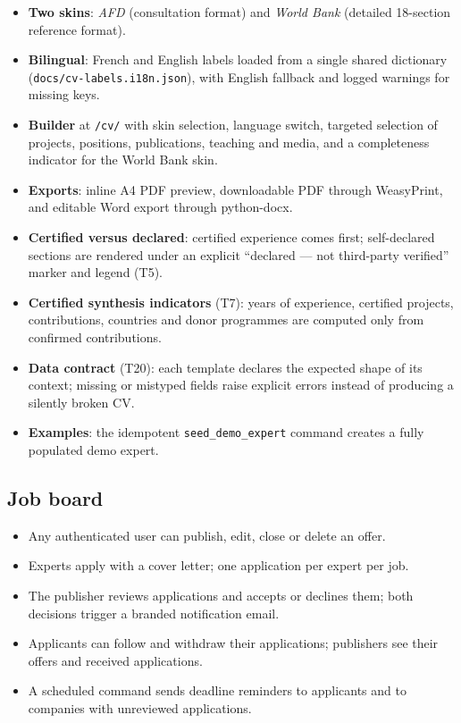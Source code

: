 \documentclass[11pt,a4paper]{article}
\begin{document}
\begin{itemize}[leftmargin=1.4em,itemsep=3pt]
  \item \textbf{Two skins}: \emph{AFD} (consultation format) and \emph{World
        Bank} (detailed 18-section reference format).
  \item \textbf{Bilingual}: French and English labels loaded from a single
        shared dictionary (\texttt{docs/cv-labels.i18n.json}), with English
        fallback and logged warnings for missing keys.
  \item \textbf{Builder} at \texttt{/cv/} with skin selection, language switch,
        targeted selection of projects, positions, publications, teaching and
        media, and a completeness indicator for the World Bank skin.
  \item \textbf{Exports}: inline A4 PDF preview, downloadable PDF through
        WeasyPrint, and editable Word export through python-docx.
  \item \textbf{Certified versus declared}: certified experience comes first;
        self-declared sections are rendered under an explicit ``declared ---
        not third-party verified'' marker and legend (T5).
  \item \textbf{Certified synthesis indicators} (T7): years of experience,
        certified projects, contributions, countries and donor programmes are
        computed only from confirmed contributions.
  \item \textbf{Data contract} (T20): each template declares the expected shape
        of its context; missing or mistyped fields raise explicit errors
        instead of producing a silently broken CV.
  \item \textbf{Examples}: the idempotent \texttt{seed\_demo\_expert} command
        creates a fully populated demo expert.
\end{itemize}

\subsection{Job board}

\begin{itemize}[leftmargin=1.4em,itemsep=3pt]
  \item Any authenticated user can publish, edit, close or delete an offer.
  \item Experts apply with a cover letter; one application per expert per job.
  \item The publisher reviews applications and accepts or declines them; both
        decisions trigger a branded notification email.
  \item Applicants can follow and withdraw their applications; publishers see
        their offers and received applications.
  \item A scheduled command sends deadline reminders to applicants and to
        companies with unreviewed applications.
\end{itemize}
\end{document}
